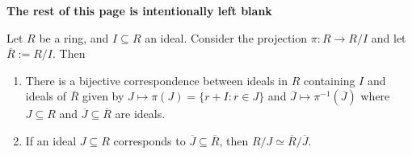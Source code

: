 \documentclass [12pt] {article}
\newenvironment{theorem}[1]{\begin{tcolorbox}[title={Theorem #1},colback=green!5!white,colframe=black!75!green]}{\end{tcolorbox}}
\renewcommand{\bf}[1]{\textbf{{#1}}}
\begin{document}
\begin{center}
    \vspace{5em}
    \bf{The rest of this page is intentionally left blank}
\end{center}

\newpage
\begin{theorem}{(Correspondence Theorem)}
    Let $R$ be a ring, and $I \subseteq R$ an ideal. Consider the projection $\pi : R \to R/I$ and
    let $\overline{R} := R/I$. Then
    \begin{enumerate}[label=(\arabic*)]
        \item There is a bijective correspondence between ideals in $R$ containing $I$ and ideals of
            $\overline{R}$ given by $J \mapsto \pi(J) = \{ r + I : r \in J \}$ and 
            $\overline{J} \mapsto \pi^{-1}(\overline{J})$ where $J \subseteq R$ and 
            $\overline{J} \subseteq \overline{R}$ are ideals.
        \item If an ideal $J \subseteq R$ corresponds to $\overline{J} \subseteq \overline{R}$, then
            $R/J \simeq \overline{R}/\overline{J}$.
    \end{enumerate}
\end{theorem}
\end{document}
